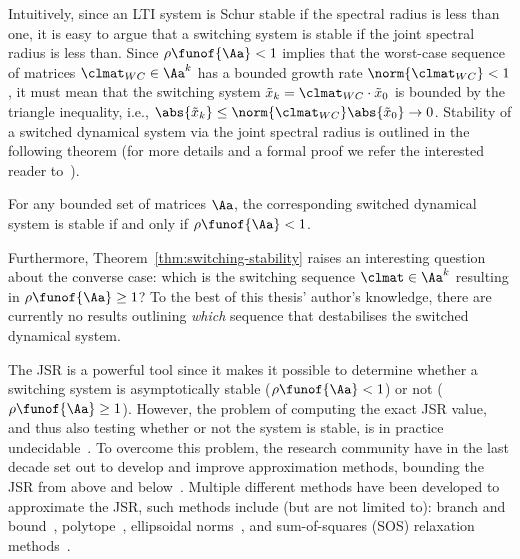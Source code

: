 Intuitively, since an LTI system is Schur stable if the spectral radius is less than one, it is easy to argue that a switching system is stable if the joint spectral radius is less than.
Since $\rho\funof{\Aa} < 1$ implies that the worst-case sequence of matrices $\clmat_{WC} \in \Aa^k$ has a bounded growth rate $\norm{\clmat_{WC}} < 1$, it must mean that the switching system $\tilde{x}_k = \clmat_{WC}\cdot \tilde{x}_0$ is bounded by the triangle inequality, i.e., $\abs{\tilde{x}_k} \leq \norm{\clmat_{WC}}\abs{\tilde{x}_0} \rightarrow 0$.
Stability of a switched dynamical system via the joint spectral radius is outlined in the following theorem (for more details and a formal proof we refer the interested reader to~\cite{Jungers:2009}).
%
\begin{theorem}%
    \label{thm:switching-stability}%
    For any bounded set of matrices $\Aa$, the corresponding switched dynamical system is stable if and only if $\rho\funof{\Aa} < 1$.
\end{theorem}
%
Furthermore, Theorem~\ref{thm:switching-stability} raises an interesting question about the converse case: which is the switching sequence $\clmat \in \Aa^k$ resulting in $\rho\funof{\Aa} \geq 1$?
To the best of this thesis' author's knowledge, there are currently no results outlining \emph{which} sequence that destabilises the switched dynamical system.

The JSR is a powerful tool since it makes it possible to determine whether a switching system is asymptotically stable ($\rho\funof{\Aa} < 1$) or not ($\rho\funof{\Aa} \geq 1$).
However, the problem of computing the exact JSR value, and thus also testing whether or not the system is stable, is in practice undecidable~\cite{Blondel:2000}.
To overcome this problem, the research community have in the last decade set out to develop and improve approximation methods, bounding the JSR from above and below~\cite{Jungers:2009}.
Multiple different methods have been developed to approximate the JSR, such methods include (but are not limited to): branch and bound~\cite{Gripenberg:1996}, polytope~\cite{Protasov:1996}, ellipsoidal norms~\cite{Blondel:2005, John:2014}, and sum-of-squares (SOS) relaxation methods~\cite{Parrilo:2008, Wang:2021a, Wang:2021b}.

